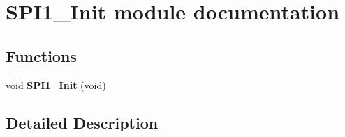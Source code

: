 \hypertarget{group___s_p_i1___init__module}{}\section{S\+P\+I1\+\_\+\+Init module documentation}
\label{group___s_p_i1___init__module}
\subsection*{Functions}
\begin{DoxyCompactItemize}
\item 
void {\bfseries S\+P\+I1\+\_\+\+Init} (void)\hypertarget{group___s_p_i1___init__module_ga9f54d534077a8c824dcc82942a7f4c02}{}\label{group___s_p_i1___init__module_ga9f54d534077a8c824dcc82942a7f4c02}

\end{DoxyCompactItemize}


\subsection{Detailed Description}
